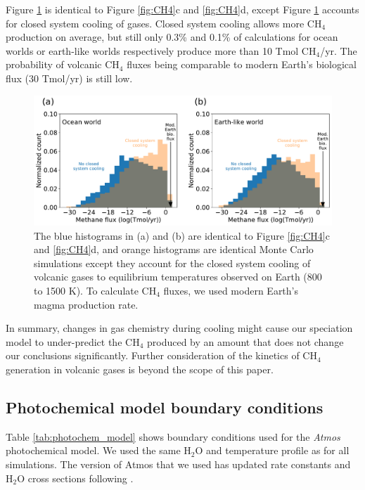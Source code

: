 Figure \ref{fig:CH4_closed} is identical to Figure \ref{fig:CH4}c and \ref{fig:CH4}d, except Figure \ref{fig:CH4_closed} accounts for closed system cooling of gases. Closed system cooling allows more CH$_4$ production on average, but still only 0.3\% and 0.1\% of calculations for ocean worlds or earth-like worlds respectively produce more than 10 Tmol CH$_4$/yr. The probability of volcanic CH$_4$ fluxes being comparable to modern Earth's biological flux (30 Tmol/yr) is still low.

\begin{figure}
    \centering
    \includegraphics[width=\textwidth]{tex/3methane/figures/CH4_prod_closedsystem.pdf}
    \caption{The blue histograms in (a) and (b) are identical to Figure \ref{fig:CH4}c and \ref{fig:CH4}d, and orange histograms are identical Monte Carlo simulations except they account for the closed system cooling of volcanic gases to equilibrium temperatures observed on Earth (800 to 1500 K). To calculate CH$_4$ fluxes, we used modern Earth's magma production rate.}
    \label{fig:CH4_closed}
\end{figure}

In summary, changes in gas chemistry during cooling might cause our speciation model to under-predict the CH$_4$ produced by an amount that does not change our conclusions significantly. Further consideration of the kinetics of CH$_4$ generation in volcanic gases is beyond the scope of this paper.

\subsection{Photochemical model boundary conditions} \label{sec:photo_boundary_cond}

Table \ref{tab:photochem_model} shows boundary conditions used for the \textit{Atmos} photochemical model. We used the same H$_2$O and temperature profile as \citet{Kharecha_2005} for all simulations. The version of Atmos that we used has updated rate constants and H$_2$O cross sections following \citet{Ranjan_2020}.

